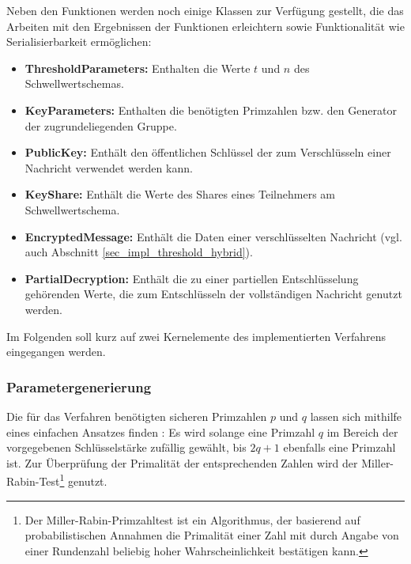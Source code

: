 Neben den Funktionen werden noch einige Klassen zur Verfügung gestellt, die das Arbeiten mit den Ergebnissen der Funktionen erleichtern sowie Funktionalität wie Serialisierbarkeit ermöglichen:

\begin{itemize}
  \item \textbf{ThresholdParameters: } Enthalten die Werte \(t\) und \(n\) des Schwellwertschemas.
  \item \textbf{KeyParameters: } Enthalten die benötigten Primzahlen bzw. den Generator der zugrundeliegenden Gruppe.
  \item \textbf{PublicKey: } Enthält den öffentlichen Schlüssel der zum Verschlüsseln einer Nachricht verwendet werden kann.
  \item \textbf{KeyShare: } Enthält die Werte des Shares eines Teilnehmers am Schwellwertschema.
  \item \textbf{EncryptedMessage: } Enthält die Daten einer verschlüsselten Nachricht (vgl. auch Abschnitt \ref{sec_impl_threshold_hybrid}).
  \item \textbf{PartialDecryption: } Enthält die zu einer partiellen Entschlüsselung gehörenden Werte, die zum Entschlüsseln der vollständigen Nachricht genutzt werden.
\end{itemize}

Im Folgenden soll kurz auf zwei Kernelemente des implementierten Verfahrens eingegangen werden.

\subsubsection{Parametergenerierung}
  
 \label{sec_impl_threshold_keyparams}
  


Die für das Verfahren benötigten sicheren Primzahlen \(p\) und \(q\) lassen sich mithilfe eines einfachen Ansatzes finden \cite{hoc1996}: Es wird solange eine Primzahl \(q\) im Bereich der vorgegebenen Schlüsselstärke zufällig gewählt, bis \(2q + 1\) ebenfalls eine Primzahl ist. Zur Überprüfung der Primalität der entsprechenden Zahlen wird der Miller-Rabin-Test\footnote{
  Der Miller-Rabin-Primzahltest ist ein Algorithmus, der basierend auf probabilistischen Annahmen die Primalität einer Zahl mit durch Angabe von einer Rundenzahl beliebig hoher Wahrscheinlichkeit bestätigen kann.
} genutzt.

